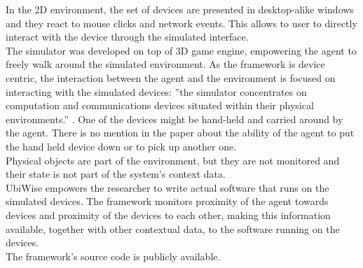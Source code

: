 In the 2D environment, the set of devices are presented in desktop-alike windows and they react to mouse clicks and network events. This allows to user to directly interact with the device through the simulated interface.\\

The simulator was developed on top of 3D game engine, empowering the agent to freely walk around the simulated environment. As the framework is device centric, the interaction between the agent and the environment is focused on interacting with the simulated devices: ''the simulator concentrates on computation and communications devices
situated within their physical environments.'' \cite{barton2003ubiwise}. One of the devices might be hand-held and carried around by the agent. There is no mention in the paper about the ability of the agent to put the hand held device down or to pick up another one.\\

Physical objects are part of the environment, but they are not monitored and their state is not part of the system's context data.\\

UbiWise empowers the researcher to write actual software that runs on the simulated devices. The framework monitors proximity of the agent towards devices and proximity of the devices to each other, making this information available, together with other contextual data, to the software running on the devices.\\

The framework's source code is publicly available.
